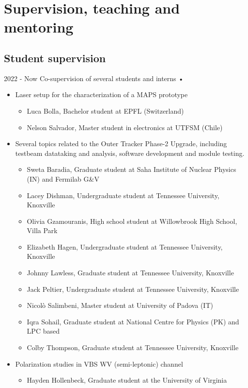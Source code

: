\section{Supervision, teaching and mentoring}

\subsection{Student supervision}
   \teaching
    {2022 - Now}
    {Co-supervision of several students and interns • }{
    \begin{itemize}
    \item Laser setup for the characterization of a MAPS prototype
	\begin{itemize}
	\item Luca Bolla, Bachelor student at EPFL (Switzerland)
	\item Nelson Salvador, Master student in electronics at UTFSM (Chile)
	\end{itemize}
    \item Several topics related to the  Outer Tracker Phase-2 Upgrade, including testbeam datataking and analysis, software development and module testing.
    \begin{itemize}
    \item Sweta Baradia, Graduate student at Saha Institute of Nuclear Physics (IN) and Fermilab G\&V
    \item Lacey Dishman, Undergraduate student at Tennessee University, Knoxville 
    \item Olivia Gzamouranis, High school student at Willowbrook High School, Villa Park
    \item Elizabeth Hagen, Undergraduate student at Tennessee University, Knoxville 
    \item Johnny Lawless, Graduate student at Tennessee University, Knoxville 
    \item Jack Peltier, Undergraduate student at Tennessee University, Knoxville  
    \item Nicol\`{o} Salimbeni, Master student at University of Padova (IT)
    \item Iqra Sohail, Graduate student at National Centre for Physics (PK) and LPC based
    \item Colby Thompson, Graduate student at Tennessee University, Knoxville 
    \end{itemize}
	\item Polarization studies in VBS WV (semi-leptonic) channel
	\begin{itemize}
	\item Hayden Hollenbeck, Graduate student at the University of Virginia
	\end{itemize}
	





    \end{itemize}
    }

